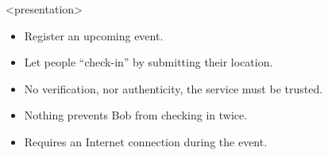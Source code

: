 \begin{frame}<presentation>
  \begin{solution}
    \begin{itemize}
      \item Register an upcoming event.
      \item Let people \enquote{check-in} by submitting their location.
    \end{itemize}
  \end{solution}

  \pause

  \begin{remark}
    \begin{itemize}
      \item No verification, nor authenticity, the service must be trusted.
      \item Nothing prevents Bob from checking in twice.
      \item Requires an Internet connection during the event.
    \end{itemize}
  \end{remark}
\end{frame}
